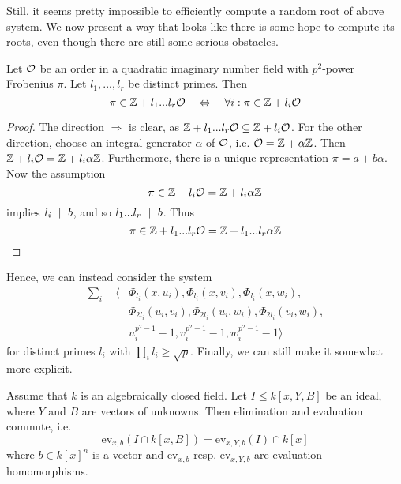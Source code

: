 Still, it seems pretty impossible to efficiently compute a random root of above system.
We now present a way that looks like there is some hope to compute its roots, even though there are still some serious obstacles.
\begin{prop}
    Let $\mathcal{O}$ be an order in a quadratic imaginary number field with $p^2$-power Frobenius $\pi$.
    Let $l_1, ..., l_r$ be distinct primes.
    Then
    \begin{equation*}
        \pi \in \mathbb{Z} + l_1 ... l_r \mathcal{O} \quad \Leftrightarrow \quad \forall i: \pi \in \mathbb{Z} + l_i \mathcal{O}
    \end{equation*}
\end{prop}
\begin{proof}
    The direction $\Rightarrow$ is clear, as $\mathbb{Z} + l_1 ... l_r \mathcal{O} \subseteq \mathbb{Z} + l_i\mathcal{O}$.
    For the other direction, choose an integral generator $\alpha$ of $\mathcal{O}$, i.e. $\mathcal{O} = \mathbb{Z} + \alpha\mathbb{Z}$.
    Then $\mathbb{Z} + l_i\mathcal{O} = \mathbb{Z} + l_i\alpha\mathbb{Z}$.
    Furthermore, there is a unique representation $\pi = a + b\alpha$.
    Now the assumption
    \begin{equation*}
        \pi \in \mathbb{Z} + l_i\mathcal{O} = \mathbb{Z} + l_i\alpha\mathbb{Z}
    \end{equation*}
    implies $l_i \ \mid \  b$, and so $l_1 ... l_r \ \mid \  b$.
    Thus
    \begin{equation*}
        \pi \in \mathbb{Z} + l_1 ... l_r \mathcal{O} = \mathbb{Z} + l_1 ... l_r \alpha \mathbb{Z} \qedhere
    \end{equation*}
\end{proof}
Hence, we can instead consider the system
\begin{align*}
    \sum_i \quad \langle &\Phi_{l_i}(x, u_i), \Phi_{l_i}(x, v_i), \Phi_{l_i}(x, w_i), \\
    &\Phi_{2l_i}(u_i, v_i), \Phi_{2l_i}(u_i, w_i), \Phi_{2l_i}(v_i, w_i), \\
    &u_i^{p^2 - 1} - 1, v_i^{p^2 - 1} - 1, w_i^{p^2 - 1} - 1 \rangle 
\end{align*}
for distinct primes $l_i$ with $\prod_i l_i \geq \sqrt{p}$.
Finally, we can still make it somewhat more explicit.
\begin{lemma}
    Assume that $k$ is an algebraically closed field.
    Let $I \leq k[x, Y, B]$ be an ideal, where $Y$ and $B$ are vectors of unknowns.
    Then elimination and evaluation commute, i.e.
    \begin{equation*}
        \mathrm{ev}_{x, b}(I \cap k[x, B]) = \mathrm{ev}_{x, Y, b}(I) \cap k[x]
    \end{equation*}
    where $b \in k[x]^n$ is a vector and $\mathrm{ev}_{x, b}$ resp. $\mathrm{ev}_{x, Y, b}$ are evaluation homomorphisms.
\end{lemma}
